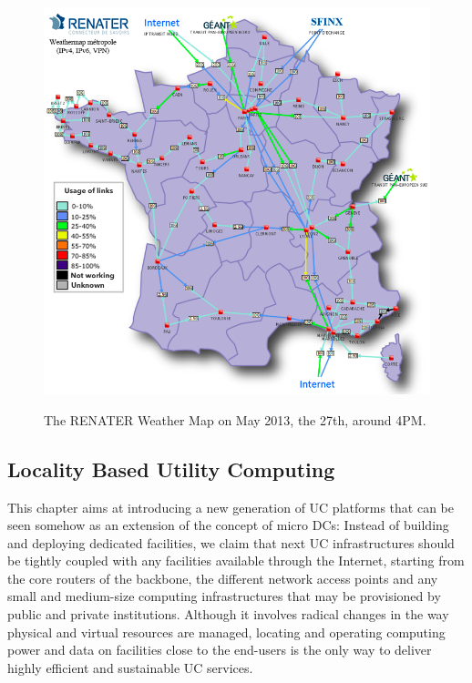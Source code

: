 \begin{figure}[b]
\includegraphics[width=12cm]{./FIGS/renater.png}
\vspace*{-.3cm}
\label{fig:renater}
\caption{The RENATER Weather Map on May 2013, the 27th, around 4PM.}
\vspace*{-.3cm}
\end{figure}

\subsection{Locality Based Utility Computing}


This chapter aims at introducing a new generation of UC platforms that can be
seen somehow as an extension of the concept of micro DCs: 
Instead of building and deploying dedicated facilities, we claim that next UC
infrastructures should be tightly coupled with any facilities available through
the Internet, starting from the core routers of the backbone, the different
network access points and any small and medium-size computing infrastructures
that may be provisioned by public and private institutions. 
 Although it involves radical changes in the way
physical and virtual resources are managed, locating and operating computing
power and data on
facilities close to the end-users is the only way to deliver highly efficient
and sustainable UC services. 

